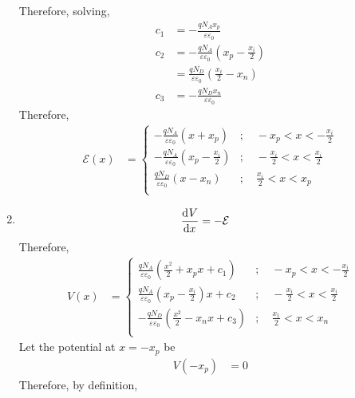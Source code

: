\documentclass[titlepage, fleqn, a4paper, 12pt, twoside]{article}
\theoremstyle{definition}
\theoremstyle{theorem}
\begin{document}
\begin{solution}
\begin{enumerate}[leftmargin=*]
			Therefore, solving,
			\begin{align*}
				c_1 & = -\frac{q N_A x_p}{\varepsilon \varepsilon_0}                                \\
				c_2 & = -\frac{q N_A}{\varepsilon \varepsilon_0} \left( x_p - \frac{x_i}{2} \right) \\
                                    & = \frac{q N_D}{\varepsilon \varepsilon_0} \left( \frac{x_i}{2} - x_n \right)  \\
				c_3 & = -\frac{q N_D x_n}{\varepsilon \varepsilon_0}
			\end{align*}
			Therefore,
			\begin{align*}
				\mathcal{E}(x) &=
					\begin{cases}
						-\frac{q N_A}{\varepsilon \varepsilon_0} (x + x_p)                          & ;\quad -x_p < x < -\frac{x_i}{2}          \\
						-\frac{q N_A}{\varepsilon \varepsilon_0} \left( x_p - \frac{x_i}{2} \right) & ;\quad -\frac{x_i}{2} < x < \frac{x_i}{2} \\
						\frac{q N_D}{\varepsilon \varepsilon_0} (x - x_n)                           & ;\quad \frac{x_i}{2} < x < x_p            \\
					\end{cases}
			\end{align*}
		\item
			\begin{align*}
				\dod{V}{x} & = -\mathcal{E}
			\end{align*}
			Therefore,
			\begin{align*}
				V(x) &=
					\begin{cases}
						\frac{q N_A}{\varepsilon \varepsilon_0} \left( \frac{x^2}{2} + x_p x + c_1 \right)  & ;\quad -x_p < x < -\frac{x_i}{2}          \\
						\frac{q N_A}{\varepsilon \varepsilon_0} \left( x_p - \frac{x_i}{2} \right) x + c_2  & ;\quad -\frac{x_i}{2} < x < \frac{x_i}{2} \\
						-\frac{q N_D}{\varepsilon \varepsilon_0} \left( \frac{x^2}{2} - x_n x + c_3 \right) & ;\quad \frac{x_1}{2} < x < x_n            \\
					\end{cases}
			\end{align*}
			Let the potential at $x = -x_p$ be
			\begin{align*}
				V(-x_p) & = 0
			\end{align*}
			Therefore, by definition,
			\begin{align*}

\end{align*}
\end{enumerate}
\end{solution}
\end{document}
